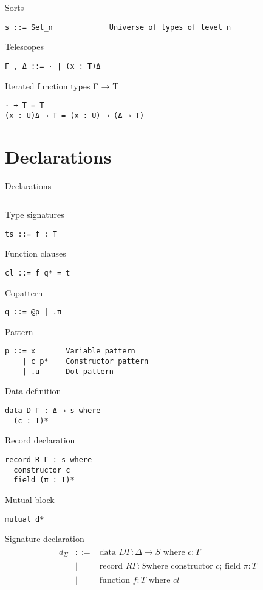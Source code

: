 \documentclass[acmlarge]{acmart}\settopmatter{}
\begin{document}
Sorts
\begin{verbatim}
s ::= Set_n             Universe of types of level n
\end{verbatim}

Telescopes
\begin{verbatim}
Γ , Δ ::= · | (x : T)Δ
\end{verbatim}

Iterated function types Γ → T
\begin{verbatim}
· → T = T
(x : U)Δ → T = (x : U) → (Δ → T)
\end{verbatim}

\section{Declarations}
\label{sec:declarations}

Declarations
\begin{verbatim}

\end{verbatim}

Type signatures
\begin{verbatim}
ts ::= f : T
\end{verbatim}

Function clauses
\begin{verbatim}
cl ::= f q* = t
\end{verbatim}

Copattern
\begin{verbatim}
q ::= @p | .π 
\end{verbatim}

Pattern
\begin{verbatim}
p ::= x       Variable pattern
    | c p*    Constructor pattern
    | .u      Dot pattern
\end{verbatim}

Data definition
\begin{verbatim}
data D Γ : Δ → s where 
  (c : T)*
\end{verbatim}

Record declaration
\begin{verbatim}
record R Γ : s where
  constructor c
  field (π : T)*
\end{verbatim}

Mutual block
\begin{verbatim}
mutual d*
\end{verbatim}

Signature declaration
\[
\begin{array}{lcl}
d_\Sigma & ::= & \text{data } D\Gamma: \Delta \to S \text{ where } \overline{c : T} \\
& \| & \text{record } R\Gamma : S \text{where constructor $c$; } \overline{\text{field }\pi : T} \\
& \| & \text{function } f : T \text{ where } \overline{cl}
\end{array}
\]
\end{document}
